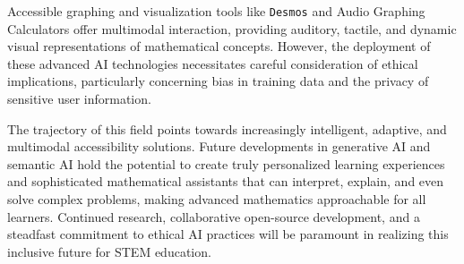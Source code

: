 Accessible graphing and visualization tools like \texttt{Desmos} and Audio Graphing Calculators offer multimodal interaction, providing auditory, tactile, and dynamic visual representations of mathematical concepts. However, the deployment of these advanced AI technologies necessitates careful consideration of ethical implications, particularly concerning bias in training data and the privacy of sensitive user information.

The trajectory of this field points towards increasingly intelligent, adaptive, and multimodal accessibility solutions. Future developments in generative AI and semantic AI hold the potential to create truly personalized learning experiences and sophisticated mathematical assistants that can interpret, explain, and even solve complex problems, making advanced mathematics approachable for all learners. Continued research, collaborative open-source development, and a steadfast commitment to ethical AI practices will be paramount in realizing this inclusive future for STEM education.
